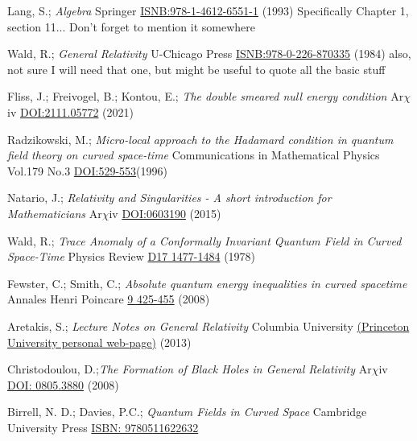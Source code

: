 \documentclass[a4paper,11pt]{article}
\numberwithin{equation}{section}
\theoremstyle{definition}
\begin{document}
\begin{thebibliography}{99}
    Lang, S.; \textit{Algebra} Springer \href{https://link.springer.com/book/10.1007/978-1-4613-0041-0}{ISNB:978-1-4612-6551-1} (1993) \color{red} Specifically Chapter 1, section 11... Don't forget to mention it somewhere\color{black}

    Wald, R.; \textit{General Relativity} U-Chicago Press \href{https://press.uchicago.edu/ucp/books/book/chicago/G/bo5952261.html}{ISNB:978-0-226-870335} (1984) \color{red}also, not sure I will need that one, but might be useful to quote all the basic stuff\color{black}

    Fliss, J.; Freivogel, B.; Kontou, E.; \textit{The double smeared null energy condition} Ar$\chi$iv \href{https://arxiv.org/abs/2111.05772#}{DOI:2111.05772} (2021)

    Radzikowski, M.; \textit{Micro-local approach to the Hadamard condition in quantum field theory on curved space-time} Communications in Mathematical Physics Vol.179 No.3 \href{https://projecteuclid.org/journals/communications-in-mathematical-physics/volume-179/issue-3/Micro-local-approach-to-the-Hadamard-condition-in-quantum-field/cmp/1104287114.full}{DOI:529-553}(1996)

    Natario, J.; \textit{Relativity and Singularities - A short introduction for Mathematicians} Ar$\chi$iv \href{https://arxiv.org/abs/math/0603190}{DOI:0603190} (2015)

    Wald, R.; \textit{Trace Anomaly of a Conformally Invariant Quantum Field in Curved Space-Time} Physics Review \href{https://journals.aps.org/prd/abstract/10.1103/PhysRevD.17.1477}{D17 1477-1484} (1978)

    Fewster, C.; Smith, C.; \textit{Absolute quantum energy inequalities in curved spacetime} Annales Henri Poincare \href{https://arxiv.org/abs/gr-qc/0702056}{9 425-455} (2008)

    Aretakis, S.; \textit{Lecture Notes on General Relativity} Columbia University \href{https://web.math.princeton.edu/~aretakis/columbiaGR.pdf}{(Princeton University personal web-page)} (2013)

    Christodoulou, D.;\textit{The Formation of Black Holes in General Relativity} Ar$\chi$iv \href{http://arxiv.org/abs/0805.3880v1#}{DOI: 0805.3880} (2008)

    Birrell, N. D.; Davies, P.C.; \textit{Quantum Fields in Curved Space} Cambridge University Press \href{https://www.cambridge.org/core/books/quantum-fields-in-curved-space/95376B0CAD78EE767FCD6205F8327F4C#}{ISBN: 9780511622632}
\end{thebibliography} 
\end{document}
